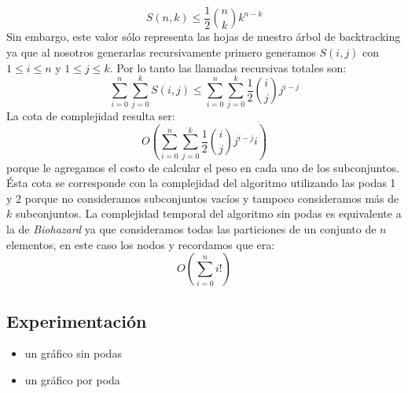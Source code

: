 \begin{displaymath}
  S(n, k) \leq \frac{1}{2}{n \choose k} k^{n-k}
\end{displaymath}
Sin embargo, este valor sólo representa las hojas de nuestro árbol de backtracking ya que al nosotros generarlas
recursivamente primero generamos $S(i, j)$ con $1 \leq i \leq n$ y $1 \leq j \leq k$. Por lo tanto las
llamadas recursivas totales son:
\begin{displaymath}
  \sum_{i=0}^n\sum_{j=0}^k S(i, j) \leq \sum_{i=0}^n\sum_{j=0}^k \frac{1}{2}{i \choose j} j^{i-j}
\end{displaymath}
La cota de complejidad resulta ser:
\begin{displaymath}
  O(\sum_{i=0}^n\sum_{j=0}^k \frac{1}{2}{i \choose j} j^{i-j}i)
\end{displaymath}
porque le agregamos el costo de calcular el peso en cada uno de los subconjuntos. Ésta cota se corresponde
con la complejidad del algoritmo utilizando las podas 1 y 2 porque no consideramos subconjuntos vacíos y
tampoco consideramos más de $k$ subconjuntos. La complejidad temporal del algoritmo sin podas es equivalente
a la de \textit{Biohazard} ya que consideramos todas las particiones de un conjunto de $n$ elementos, en este caso
los nodos y recordamos que era:
\begin{displaymath}
  O(\sum_{i=0}^ni!)
\end{displaymath}

\subsection{Experimentación}
\begin{itemize}
  \item un gráfico sin podas
  \item un gráfico por poda
\end{itemize}

